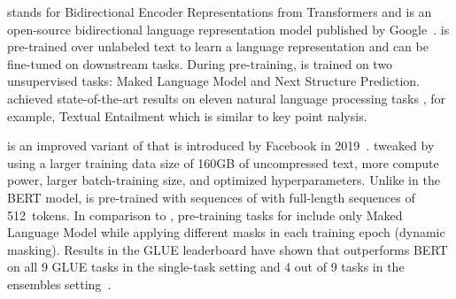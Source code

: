 \Bert stands for Bidirectional Encoder Representations from Transformers and is an open-source bidirectional language representation model published by Google~\cite{DevlinCLT2019}. 
\Bert is pre-trained over unlabeled text to learn a language representation and can be fine-tuned on downstream tasks. During pre-training, \Bert is trained on two unsupervised tasks: Maked Language Model and Next Structure Prediction. \Bert achieved state-of-the-art results on eleven natural language processing tasks \cite{WangSMHLB2018}, for example, Textual Entailment which is similar to key point nalysis.

\Roberta is an improved variant of \Bert that is introduced by Facebook in 2019~\cite{LiuOGDJCLLZS2019}. \citet{LiuOGDJCLLZS2019} tweaked \Bert by using a larger training data size of 160GB of uncompressed text, more compute power, larger batch-training size, and optimized hyperparameters. Unlike in the BERT model, \Roberta is pre-trained with sequences of with full-length sequences of 512~tokens. In comparison to \Bert, pre-training tasks for \Roberta include only Maked Language Model while applying different masks in each training epoch (dynamic masking). Results in the GLUE leaderboard have shown that \Roberta outperforms BERT on all 9 GLUE tasks in the single-task setting and 4 out of 9 tasks in the ensembles setting~\cite{WangSMHLB2018,LiuOGDJCLLZS2019}.


